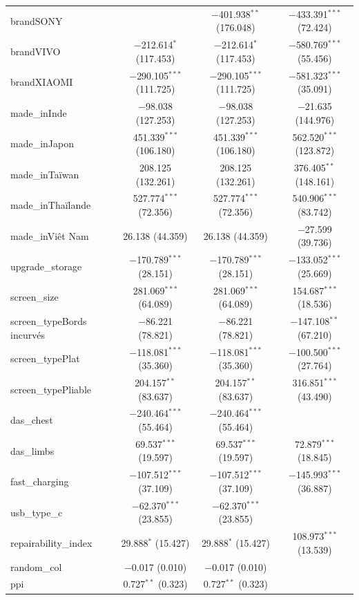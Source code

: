 \documentclass[
  12pt,
]{report}
\begin{document}
\begin{table}[!htbp]
\begin{tabular}{@{\extracolsep{5pt}}lccc}
  brandSONY &  & $-$401.938$^{**}$ (176.048) & $-$433.391$^{***}$ (72.424) \\ 
  brandVIVO & $-$212.614$^{*}$ (117.453) & $-$212.614$^{*}$ (117.453) & $-$580.769$^{***}$ (55.456) \\ 
  brandXIAOMI & $-$290.105$^{***}$ (111.725) & $-$290.105$^{***}$ (111.725) & $-$581.323$^{***}$ (35.091) \\ 
  made\_inInde & $-$98.038 (127.253) & $-$98.038 (127.253) & $-$21.635 (144.976) \\ 
  made\_inJapon & 451.339$^{***}$ (106.180) & 451.339$^{***}$ (106.180) & 562.520$^{***}$ (123.872) \\ 
  made\_inTaïwan & 208.125 (132.261) & 208.125 (132.261) & 376.405$^{**}$ (148.161) \\ 
  made\_inThaïlande & 527.774$^{***}$ (72.356) & 527.774$^{***}$ (72.356) & 540.906$^{***}$ (83.742) \\ 
  made\_inViêt Nam & 26.138 (44.359) & 26.138 (44.359) & $-$27.599 (39.736) \\ 
  upgrade\_storage & $-$170.789$^{***}$ (28.151) & $-$170.789$^{***}$ (28.151) & $-$133.052$^{***}$ (25.669) \\ 
  screen\_size & 281.069$^{***}$ (64.089) & 281.069$^{***}$ (64.089) & 154.687$^{***}$ (18.536) \\ 
  screen\_typeBords incurvés & $-$86.221 (78.821) & $-$86.221 (78.821) & $-$147.108$^{**}$ (67.210) \\ 
  screen\_typePlat & $-$118.081$^{***}$ (35.360) & $-$118.081$^{***}$ (35.360) & $-$100.500$^{***}$ (27.764) \\ 
  screen\_typePliable & 204.157$^{**}$ (83.637) & 204.157$^{**}$ (83.637) & 316.851$^{***}$ (43.490) \\ 
  das\_chest & $-$240.464$^{***}$ (55.464) & $-$240.464$^{***}$ (55.464) &  \\ 
  das\_limbs & 69.537$^{***}$ (19.597) & 69.537$^{***}$ (19.597) & 72.879$^{***}$ (18.845) \\ 
  fast\_charging & $-$107.512$^{***}$ (37.109) & $-$107.512$^{***}$ (37.109) & $-$145.993$^{***}$ (36.887) \\ 
  usb\_type\_c & $-$62.370$^{***}$ (23.855) & $-$62.370$^{***}$ (23.855) &  \\ 
  repairability\_index & 29.888$^{*}$ (15.427) & 29.888$^{*}$ (15.427) & 108.973$^{***}$ (13.539) \\ 
  random\_col & $-$0.017 (0.010) & $-$0.017 (0.010) &  \\ 
  ppi & 0.727$^{**}$ (0.323) & 0.727$^{**}$ (0.323) &  \\ 

\end{tabular}
\end{table}
\end{document}
